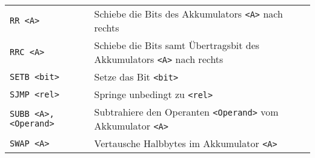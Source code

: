 \begin{longtable}[c]{@{}ll@{}}
\begin{minipage}[t]{0.25\columnwidth}
\texttt{RR\ \textless{}A\textgreater{}}
\strut\end{minipage} &
\begin{minipage}[t]{0.69\columnwidth}\raggedright\strut
Schiebe die Bits des Akkumulators \texttt{\textless{}A\textgreater{}}
nach rechts
\strut\end{minipage}\tabularnewline
\begin{minipage}[t]{0.25\columnwidth}\raggedright\strut
\texttt{RRC\ \textless{}A\textgreater{}}
\strut\end{minipage} &
\begin{minipage}[t]{0.69\columnwidth}\raggedright\strut
Schiebe die Bits samt Übertragsbit des Akkumulators
\texttt{\textless{}A\textgreater{}} nach rechts
\strut\end{minipage}\tabularnewline
\begin{minipage}[t]{0.25\columnwidth}\raggedright\strut
\texttt{SETB\ \textless{}bit\textgreater{}}
\strut\end{minipage} &
\begin{minipage}[t]{0.69\columnwidth}\raggedright\strut
Setze das Bit \texttt{\textless{}bit\textgreater{}}
\strut\end{minipage}\tabularnewline
\begin{minipage}[t]{0.25\columnwidth}\raggedright\strut
\texttt{SJMP\ \textless{}rel\textgreater{}}
\strut\end{minipage} &
\begin{minipage}[t]{0.69\columnwidth}\raggedright\strut
Springe unbedingt zu \texttt{\textless{}rel\textgreater{}}
\strut\end{minipage}\tabularnewline
\begin{minipage}[t]{0.25\columnwidth}\raggedright\strut
\texttt{SUBB\ \textless{}A\textgreater{},\textless{}Operand\textgreater{}}
\strut\end{minipage} &
\begin{minipage}[t]{0.69\columnwidth}\raggedright\strut
Subtrahiere den Operanten \texttt{\textless{}Operand\textgreater{}} vom
Akkumulator \texttt{\textless{}A\textgreater{}}
\strut\end{minipage}\tabularnewline
\begin{minipage}[t]{0.25\columnwidth}\raggedright\strut
\texttt{SWAP\ \textless{}A\textgreater{}}
\strut\end{minipage} &
\begin{minipage}[t]{0.69\columnwidth}\raggedright\strut
Vertausche Halbbytes im Akkumulator \texttt{\textless{}A\textgreater{}}
\strut\end{minipage}\tabularnewline

\end{longtable}
